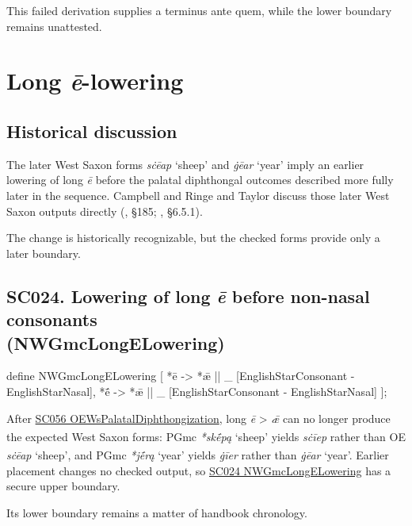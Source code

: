 \documentclass[
  british,
  a4paper,
  openany]{book}
\providecommand{\Pred}[1]{\textsuperscript{\dag}\emph{#1}}
\providecommand{\Recon}[1]{\emph{*#1}}
{\catcode`→=\active \global\def→{\ensuremath{\rightarrow}}}
\providecommand{\texorpdfstring}[2]{#1}
\DeclareRobustCommand{\CAPRRuleHeading}[2]{%
  #1\texorpdfstring{\\(#2)}{ (#2)}%
}
\providecommand{\Pred}[1]{\textsuperscript{\dag}\emph{#1}}
\providecommand{\Recon}[1]{\emph{*#1}}
{\catcode`→=\active \global\def→{\ensuremath{\rightarrow}}}
\begin{document}
This failed derivation supplies a terminus ante quem, while the lower
boundary remains unattested.

\newpage

\section{\texorpdfstring{Long
\emph{ē}-lowering}{Long -lowering}}\label{long--lowering}

\subsection{Historical discussion}\label{historical-discussion-17}

The later West Saxon forms \emph{sċēap} `sheep' and \emph{ġēar} `year'
imply an earlier lowering of long \emph{ē} before the palatal
diphthongal outcomes described more fully later in the sequence.
Campbell and Ringe and Taylor discuss those later West Saxon outputs
directly (, §185;
, §6.5.1).

The change is historically recognizable, but the checked forms provide
only a later boundary.

\subsection{\texorpdfstring{\CAPRRuleHeading{SC024. Lowering of long \emph{ē} before non-nasal consonants}{NWGmcLongELowering}}{}}\label{rule-NWGmcLongELowering}

\begin{ReaderFacingFoma}
define NWGmcLongELowering [
    {*ē} -> {*ǣ} || _ [EnglishStarConsonant - EnglishStarNasal],
    {*ḗ} -> {*ǣ} || _ [EnglishStarConsonant - EnglishStarNasal]
];
\end{ReaderFacingFoma}

After \hyperref[rule-OEWsPalatalDiphthongization]{SC056
OEWsPalatalDiphthongization}, long \emph{ē} \textgreater{} \emph{ǣ} can
no longer produce the expected West Saxon forms: PGmc \Recon{skḗpą}
`sheep' yields \Pred{sċīep} rather than OE \emph{sċēap} `sheep', and
PGmc \Recon{jḗrą} `year' yields \Pred{ġīer} rather than \emph{ġēar}
`year'. Earlier placement changes no checked output, so
\hyperref[rule-NWGmcLongELowering]{SC024 NWGmcLongELowering} has a
secure upper boundary.

Its lower boundary remains a matter of handbook chronology.
\end{document}
